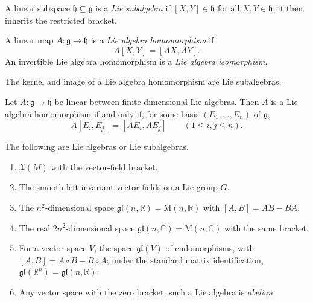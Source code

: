 \begin{definition}
\label{def:8-60-extra-3}



A linear subspace $\mathfrak h\subseteq\mathfrak g$ is a \emph{Lie
subalgebra} if $[X,Y]\in\mathfrak h$ for all $X,Y\in\mathfrak h$; it then
inherits the restricted bracket.
\end{definition}

\begin{definition}
\label{def:8-60-extra-4}



A linear map $A\colon\mathfrak g\to\mathfrak h$ is a \emph{Lie algebra
homomorphism} if
\[
A[X,Y]=[AX,AY].
\]
An invertible Lie algebra homomorphism is a \emph{Lie algebra isomorphism}.
\end{definition}

\begin{proposition}
\label{exer:8-34}



The kernel and image of a Lie algebra homomorphism are Lie subalgebras.
\end{proposition}

\begin{proposition}
\label{exer:8-35}




Let $A\colon\mathfrak g\to\mathfrak h$ be linear between finite-dimensional
Lie algebras. Then $A$ is a Lie algebra homomorphism if and only if, for
some basis $(E_1,\ldots,E_n)$ of $\mathfrak g$,
\[
A[E_i,E_j]=[AE_i,AE_j]
\qquad(1\leq i,j\leq n).
\]
\end{proposition}

\begin{example}
\label{ex:8-36}





The following are Lie algebras or Lie subalgebras.
\begin{enumerate}
\item $\mathfrak{X}(M)$ with the vector-field bracket.
\item The smooth left-invariant vector fields on a Lie group $G$.
\item The $n^2$-dimensional space
$\mathfrak{gl}(n,\mathbb{R})=\mathrm{M}(n,\mathbb{R})$ with
$[A,B]=AB-BA$.
\item The real $2n^2$-dimensional space
$\mathfrak{gl}(n,\mathbb{C})=\mathrm{M}(n,\mathbb{C})$ with the same bracket.
\item For a vector space $V$, the space $\mathfrak{gl}(V)$ of endomorphisms,
with $[A,B]=A\circ B-B\circ A$; under the standard matrix identification,
$\mathfrak{gl}(\mathbb R^n)=\mathfrak{gl}(n,\mathbb R)$.
\item Any vector space with the zero bracket; such a Lie algebra is
\emph{abelian}.
\end{enumerate}
\end{example}

